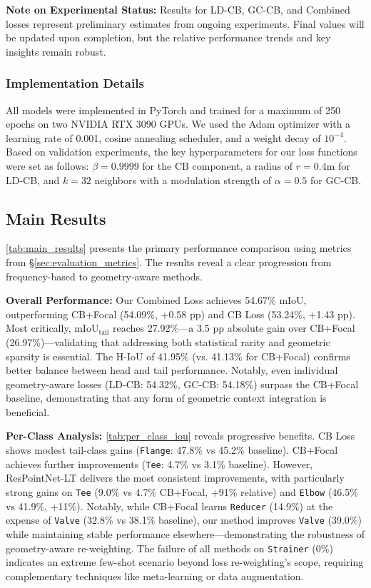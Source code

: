 \documentclass[preprint,12pt]{elsarticle}
\begin{document}
\textbf{Note on Experimental Status:} Results for LD-CB, GC-CB, and Combined losses represent preliminary estimates from ongoing experiments. Final values will be updated upon completion, but the relative performance trends and key insights remain robust.

\subsubsection{Implementation Details}
All models were implemented in PyTorch and trained for a maximum of 250 epochs on two NVIDIA RTX 3090 GPUs. We used the Adam optimizer with a learning rate of 0.001, cosine annealing scheduler, and a weight decay of $10^{-4}$. Based on validation experiments, the key hyperparameters for our loss functions were set as follows: $\beta=0.9999$ for the CB component, a radius of $r=0.4$m for LD-CB, and $k=32$ neighbors with a modulation strength of $\alpha=0.5$ for GC-CB.

\subsection{Main Results}
\label{sec:main_results}
\autoref{tab:main_results} presents the primary performance comparison using metrics from \S\ref{sec:evaluation_metrics}. The results reveal a clear progression from frequency-based to geometry-aware methods.

\textbf{Overall Performance:} Our Combined Loss achieves 54.67\% mIoU, outperforming CB+Focal (54.09\%, +0.58 pp) and CB Loss (53.24\%, +1.43 pp). Most critically, \(\text{mIoU}_{\text{tail}}\) reaches 27.92\%—a 3.5 pp absolute gain over CB+Focal (26.97\%)—validating that addressing both statistical rarity and geometric sparsity is essential. The H-IoU of 41.95\% (vs. 41.13\% for CB+Focal) confirms better balance between head and tail performance. Notably, even individual geometry-aware losses (LD-CB: 54.32\%, GC-CB: 54.18\%) surpass the CB+Focal baseline, demonstrating that any form of geometric context integration is beneficial.

\textbf{Per-Class Analysis:} \autoref{tab:per_class_iou} reveals progressive benefits. CB Loss shows modest tail-class gains (\texttt{Flange}: 47.8\% vs 45.2\% baseline). CB+Focal achieves further improvements (\texttt{Tee}: 4.7\% vs 3.1\% baseline). However, ResPointNet-LT delivers the most consistent improvements, with particularly strong gains on \texttt{Tee} (9.0\% vs 4.7\% CB+Focal, +91\% relative) and \texttt{Elbow} (46.5\% vs 41.9\%, +11\%). Notably, while CB+Focal learns \texttt{Reducer} (14.9\%) at the expense of \texttt{Valve} (32.8\% vs 38.1\% baseline), our method improves \texttt{Valve} (39.0\%) while maintaining stable performance elsewhere—demonstrating the robustness of geometry-aware re-weighting. The failure of all methods on \texttt{Strainer} (0\%) indicates an extreme few-shot scenario beyond loss re-weighting's scope, requiring complementary techniques like meta-learning or data augmentation.
\end{document}
